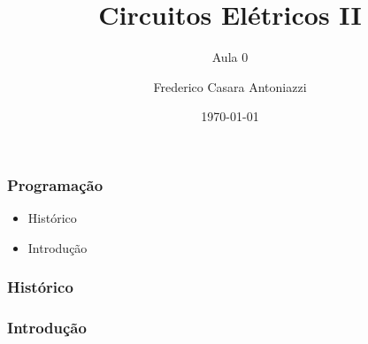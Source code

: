 \documentclass[12pt]{beamer}
\begin{document}
	\author{Frederico Casara Antoniazzi}
	\title{Circuitos Elétricos II}
	\subtitle{Aula 0}
	\date{\today}
	
	\begin{frame}[plain]
		\maketitle
	\end{frame}
	
	\begin{frame}
		\frametitle{Programação}
		
		\begin{itemize}
			\item Histórico
			\item Introdução
		\end{itemize}
		
	\end{frame}
	
	\begin{frame}
		\frametitle{Histórico}
	\end{frame}
	
	\begin{frame}
		\frametitle{Introdução}
	\end{frame}
	
	\begin{frame}
		\frametitle{}
	\end{frame}
	
	\begin{frame}
		\frametitle{}
	\end{frame}
	
\end{document}
